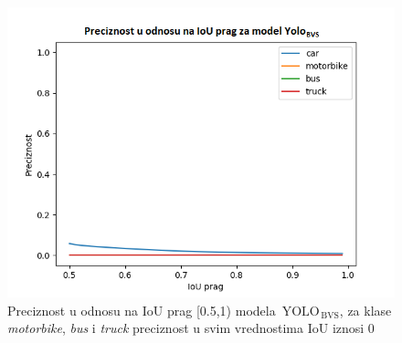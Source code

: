 \documentclass[12pt,oneside]{memoir}
\newcommand{\yolo}{\ensuremath{\,\textrm{YOLO}}}
\newcommand{\bvs}{\ensuremath{\,\textrm{BVS}}}
\begin{document}
\begin{figure}[!ht]
    \centering
    \includegraphics[width=1\textwidth]{matfmaster/glava4/precision_vs_iou_threshold_NOaugment.png}
    \caption{Preciznost u odnosu na IoU prag [0.5,1) modela $\yolo_{\bvs}$, za klase \textit{motorbike}, \textit{bus} i \textit{truck} preciznost u svim vrednostima IoU iznosi 0}
    \label{fig:section4_yolo4noaug_prc}
\end{figure}
\end{document}
